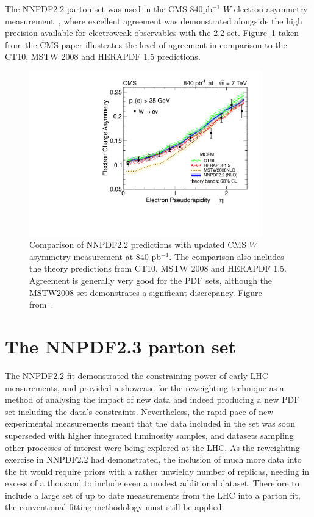 The NNPDF2.2 parton set was used in the CMS 840pb$^{-1}$ $W$ electron asymmetry measurement~\cite{Chatrchyan:2012xt}, where excellent agreement was demonstrated alongside the high precision available for electroweak observables with the 2.2 set. Figure~\ref{fig:Wasy22} taken from the CMS paper illustrates the level of agreement in comparison to the CT10, MSTW 2008 and HERAPDF 1.5 predictions. 

\begin{figure}[h!]
\centering
\includegraphics[width=0.9\textwidth]{6-LHCimpact/figs/results_MSTW_corr.pdf}
\caption[Comparison of NNPDF2.2 predictions with CMS $W$ asymmetry measurement]{Comparison of NNPDF2.2 predictions with updated CMS $W$ asymmetry measurement at 840 pb$^{-1}$.  The comparison also includes the theory predictions from CT10, MSTW 2008 and HERAPDF 1.5. Agreement is generally very good for the PDF sets, although the MSTW2008 set demonstrates a significant discrepancy. Figure from~\cite{Chatrchyan:2012xt}.}
\label{fig:Wasy22}
\end{figure}



\section{The NNPDF2.3 parton set}
The NNPDF2.2 fit demonstrated the constraining power of early LHC measurements, and provided a showcase for the reweighting technique as a method of analysing the impact of new data and indeed producing a new PDF set including the data's constraints. Nevertheless, the rapid pace of new experimental measurements meant that the data included in the set was soon superseded with higher integrated luminosity samples, and datasets sampling other processes of interest were being explored at the LHC. As the reweighting exercise in NNPDF2.2 had demonstrated, the inclusion of much more data into the fit would require priors with a rather unwieldy number of replicas, needing in excess of a thousand to include even a modest additional dataset. Therefore to include a large set of up to date measurements from the LHC into a parton fit, the conventional fitting methodology must still be applied.

